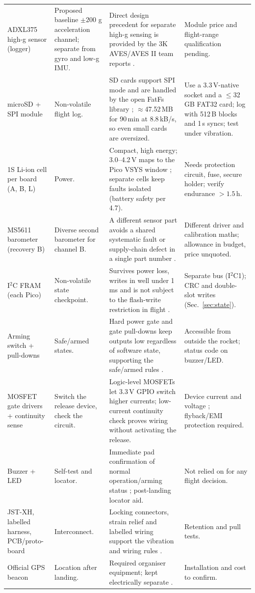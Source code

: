 \begin{longtable}{@{}L{23mm}L{30mm}L{60mm}L{37mm}@{}}
ADXL375 high-g sensor (logger) & Proposed baseline $\pm200$ g acceleration channel; separate from gyro and low-g IMU. & Direct design precedent for separate high-g sensing is provided by the 3K AVES/AVES II team reports \cite{astg2021aves,astg2022aves2,adxl375ds}. & Module price and flight-range qualification pending.\\
microSD + SPI module & Non-volatile flight log. & SD cards support SPI mode \cite{sdspec} and are handled by the open FatFs library \cite{fatfs}; $\approx$47.52\,MB for 90\,min at 8.8\,kB/s, so even small cards are oversized. & Use a 3.3\,V-native socket and a $\le$32\,GB FAT32 card; log with 512\,B blocks and 1\,s syncs; test under vibration.\\
1S Li-ion cell per board (A, B, L) & Power. & Compact, high energy; 3.0--4.2\,V maps to the Pico VSYS window \cite{picods}; separate cells keep faults isolated (battery safety per \cite{rtc2027app03} 4.7). & Needs protection circuit, fuse, secure holder; verify endurance $>1.5$\,h.\\
MS5611 barometer (recovery B) & Diverse second barometer for channel B. & A different sensor part avoids a shared systematic fault or supply-chain defect in a single part number \cite{ms5611ds,knight1986}. & Different driver and calibration maths; allowance in budget, price unquoted.\\
I$^2$C FRAM (each Pico) & Non-volatile state checkpoint. & Survives power loss, writes in well under 1\,ms and is not subject to the flash-write restriction in flight \cite{fram,rp2040ds}. & Separate bus (I$^2$C1); CRC and double-slot writes (Sec.~\ref{sec:state}).\\
Arming switch + pull-downs & Safe/armed states. & Hard power gate and gate pull-downs keep outputs low regardless of software state, supporting the safe/armed rules \cite{rtc2027app03}. & Accessible from outside the rocket; status code on buzzer/LED.\\
MOSFET gate drivers + continuity sense & Switch the release device, check the circuit. & Logic-level MOSFETs let 3.3\,V GPIO switch higher currents; low-current continuity check proves wiring without activating the release. & Device current and voltage ; flyback/EMI protection required.\\
Buzzer + LED & Self-test and locator. & Immediate pad confirmation of normal operation/arming status \cite{rtc2027app03}; post-landing locator aid. & Not relied on for any flight decision.\\
JST-XH, labelled harness, PCB/proto-board & Interconnect. & Locking connectors, strain relief and labelled wiring support the vibration and wiring rules \cite{rtc2027app03}. & Retention and pull tests.\\
Official GPS beacon & Location after landing. & Required organiser equipment; kept electrically separate \cite{rtc2027app03}. & Installation and cost to confirm.\\
\end{longtable}
\normalsize

